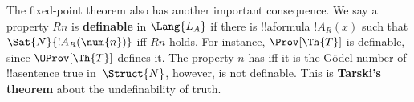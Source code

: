 The fixed-point theorem also has another important consequence. We say
a property $Rn$ is \textbf{definable} in $\Lang{L_A}$ if there is
!!a{formula} $!A_R(x)$ such that $\Sat{N}{!A_R(\num{n})}$ iff $Rn$
holds. For instance, $\Prov[\Th{T}]$ is definable, since
$\OProv[\Th{T}]$ defines it. The property $n$ has iff it is the
G\"odel number of !!a{sentence} true in~$\Struct{N}$, however, is not
definable. This is \textbf{Tarski's theorem} about the undefinability
of truth.
